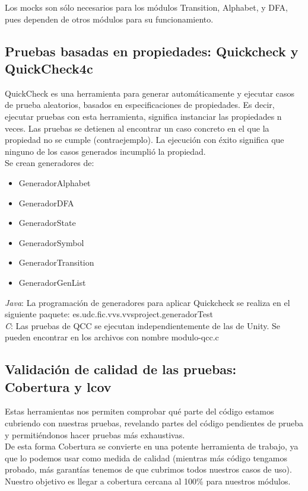 \documentclass[DIV=calc,paper=a4,fontsize=11pt,onecolumn]{scrartcl} %
\begin{document}
Los mocks son sólo necesarios para los módulos Transition, Alphabet, y DFA, pues dependen de otros módulos para su funcionamiento.

\subsection{Pruebas basadas en propiedades: Quickcheck y QuickCheck4c}
QuickCheck es una  herramienta para generar automáticamente y ejecutar casos de prueba aleatorios, basados en especificaciones de propiedades. Es decir, ejecutar pruebas con esta herramienta, significa instanciar las propiedades n veces. Las pruebas se detienen al encontrar un caso concreto en el que la propiedad no se cumple (contraejemplo). La ejecución con éxito significa que ninguno de los casos generados incumplió la propiedad. \\
Se crean generadores de:
\begin{itemize}
	\item GeneradorAlphabet
	\item GeneradorDFA
	\item GeneradorState
	\item GeneradorSymbol
	\item GeneradorTransition
	\item GeneradorGenList
\end{itemize}

\textit{Java}: La programación de generadores para aplicar Quickcheck se realiza en el siguiente paquete: es.udc.fic.vvs.vvsproject.generadorTest \\

\textit{C}: Las pruebas de QCC se ejecutan independientemente de las de Unity. Se pueden encontrar en los archivos con nombre modulo-qcc.c

\subsection{Validación de calidad de las pruebas: Cobertura y lcov}
Estas herramientas nos permiten comprobar qué parte del código estamos cubriendo con nuestras pruebas, revelando partes del código pendientes de prueba y permitiéndonos hacer pruebas más exhaustivas. \\
De esta forma Cobertura se convierte en una potente herramienta de trabajo, ya que lo podemos usar como medida de calidad (mientras más código tengamos probado, más garantías tenemos de que cubrimos todos nuestros casos de uso).
Nuestro objetivo es llegar a cobertura cercana al 100\% para nuestros módulos.
\end{document}
